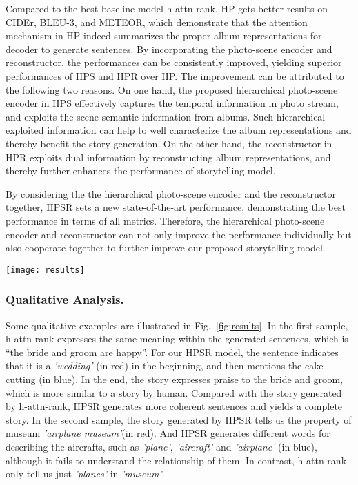 \documentclass[letterpaper]{article} \usepackage{aaai19}  \usepackage{times}  \usepackage{helvet}  \usepackage{courier}  \usepackage{url}  \usepackage{graphicx}  \usepackage{color}
\begin{document}
Compared to the best baseline model h-attn-rank, HP gets better results on CIDEr, BLEU-3, and METEOR, which demonstrate that the attention mechanism in HP indeed summarizes the proper album representations for decoder to generate sentences. By incorporating the photo-scene encoder and reconstructor, the performances can be consistently improved, yielding  superior performances of HPS and HPR over HP.
The improvement can be attributed to the following two reasons. On one hand, the proposed hierarchical photo-scene encoder in HPS effectively captures the temporal information in photo stream, and  exploits the scene semantic information from albums. Such hierarchical exploited information can help to well characterize the album representations and thereby  benefit the story generation. On the other hand, the reconstructor in HPR exploits dual information by reconstructing album representations, and thereby further enhances the performance of storytelling model.



By considering the the hierarchical photo-scene encoder and the reconstructor together, HPSR sets a new state-of-the-art performance, demonstrating the best performance in terms of all metrics. Therefore, the hierarchical photo-scene encoder and reconstructor can not only improve the performance individually but also cooperate together to further improve our proposed storytelling model.








\begin{figure*}[!ht]
\centering
\texttt{[image: results]}
\caption{Some story examples on the VIST dataset generated by h-attn-rank and HPSR. Due to the page limit, one of the five ground-truth stories is shown. Words related with story themes are in red and blue. And scene boundaries detected are shown with green border.}
\label{fig:results}
\end{figure*}

\subsubsection{Qualitative Analysis.}
Some qualitative examples are illustrated in Fig.~\ref{fig:results}.
In the first sample, h-attn-rank expresses the same meaning within the generated sentences, which is ``the bride and groom are happy''. For our HPSR model,  the sentence indicates that it is a \textit{'wedding'} (in red) in the beginning, and then mentions the cake-cutting (in blue).
In the end, the story expresses praise to the bride and groom, which is more similar to a story by human.
Compared with the story generated by h-attn-rank, HPSR generates more coherent sentences and yields a complete story.
In the second sample, the story generated by HPSR tells us the property of museum \textit{'airplane museum'}(in red). And HPSR generates  different words for describing the aircrafts, such as \textit{'plane'}, \textit{'aircraft'} and \textit{'airplane'} (in blue), although it fails to understand the relationship of them. In contrast, h-attn-rank only tell us just \textit{'planes'} in \textit{'museum'}.
\end{document}
